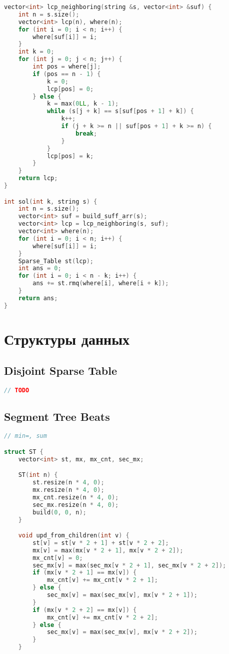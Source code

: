 \documentclass[10pt,a4paper,landscape,twosided]{extarticle}
\begin{document}
\begin{multicols*}{3}
\begin{lstlisting}[language=C++]
vector<int> lcp_neighboring(string &s, vector<int> &suf) {
    int n = s.size();
    vector<int> lcp(n), where(n);
    for (int i = 0; i < n; i++) {
        where[suf[i]] = i;
    }
    int k = 0;
    for (int j = 0; j < n; j++) {
        int pos = where[j];
        if (pos == n - 1) {
            k = 0;
            lcp[pos] = 0;
        } else {
            k = max(0LL, k - 1);
            while (s[j + k] == s[suf[pos + 1] + k]) {
                k++;
                if (j + k >= n || suf[pos + 1] + k >= n) {
                    break;
                }
            }
            lcp[pos] = k;
        }
    }
    return lcp;
}

int sol(int k, string s) {
    int n = s.size();
    vector<int> suf = build_suff_arr(s);
    vector<int> lcp = lcp_neighboring(s, suf);
    vector<int> where(n);
    for (int i = 0; i < n; i++) {
        where[suf[i]] = i;
    }
    Sparse_Table st(lcp);
    int ans = 0;
    for (int i = 0; i < n - k; i++) {
        ans += st.rmq(where[i], where[i + k]);
    }
    return ans;
}

\end{lstlisting}

\section{Структуры данных}

\subsection{Disjoint Sparse Table}
\begin{lstlisting}[language=C++]
// TODO
\end{lstlisting}

\subsection{Segment Tree Beats}
\begin{lstlisting}[language=C++]
// min=, sum

struct ST {
    vector<int> st, mx, mx_cnt, sec_mx;

    ST(int n) {
        st.resize(n * 4, 0);
        mx.resize(n * 4, 0);
        mx_cnt.resize(n * 4, 0);
        sec_mx.resize(n * 4, 0);
        build(0, 0, n);
    }

    void upd_from_children(int v) {
        st[v] = st[v * 2 + 1] + st[v * 2 + 2];
        mx[v] = max(mx[v * 2 + 1], mx[v * 2 + 2]);
        mx_cnt[v] = 0;
        sec_mx[v] = max(sec_mx[v * 2 + 1], sec_mx[v * 2 + 2]);
        if (mx[v * 2 + 1] == mx[v]) {
            mx_cnt[v] += mx_cnt[v * 2 + 1];
        } else {
            sec_mx[v] = max(sec_mx[v], mx[v * 2 + 1]);
        }
        if (mx[v * 2 + 2] == mx[v]) {
            mx_cnt[v] += mx_cnt[v * 2 + 2];
        } else {
            sec_mx[v] = max(sec_mx[v], mx[v * 2 + 2]);
        }
    }


\end{lstlisting}
\end{multicols*}
\end{document}
